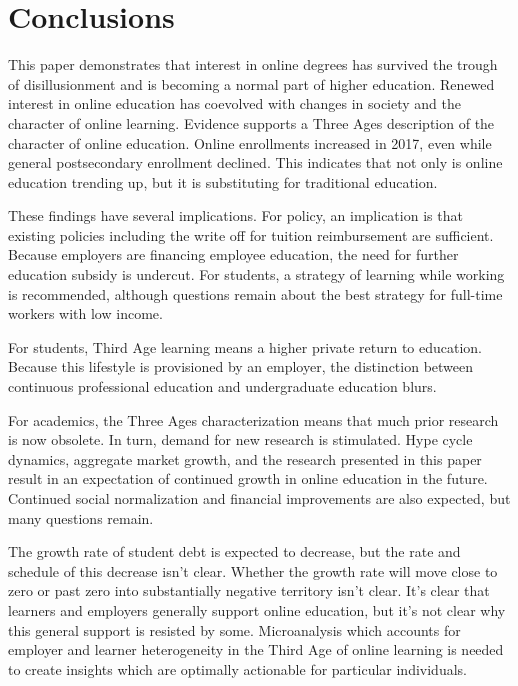 \documentclass[review]{elsarticle}
\begin{document}
    \section{Conclusions}

    This paper demonstrates that interest in online degrees has survived the trough of disillusionment
    and is becoming a normal part of higher education.
    Renewed interest in online education has coevolved with changes in society and the character of
    online learning. Evidence supports a Three Ages description of the character of online education.
    Online enrollments increased in 2017, even while general postsecondary enrollment declined\cite{lederman2018online}.
    This indicates that not only is online education trending up, but it is substituting for traditional education.

    These findings have several implications. For policy, an implication is that existing policies
    including the write off for tuition reimbursement are sufficient.
    Because employers are financing employee education, the need for further education subsidy is undercut.
    For students, a strategy of learning while working is recommended,
    although questions remain about the best strategy for full-time workers with low income.

    For students, Third Age learning means a higher private return to education.
    Because this lifestyle is provisioned by an employer,
    the distinction between continuous professional education and undergraduate education blurs.

    For academics, the Three Ages characterization means that much prior research is now obsolete.
    In turn, demand for new research is stimulated.
    Hype cycle dynamics, aggregate market growth, and the research presented in this paper
    result in an expectation of continued growth in online education in the future.
    Continued social normalization and financial improvements are also expected,
    but many questions remain.

    The growth rate of student debt is expected to decrease, but the rate and schedule of this decrease isn't clear.
    Whether the growth rate will move close to zero or past zero into substantially negative territory isn't clear.
    It's clear that learners and employers generally support online education,
    but it's not clear why this general support is resisted by some.
    Microanalysis which accounts for employer and learner heterogeneity in the Third Age
    of online learning is needed to create insights which are optimally actionable for particular individuals.

    

    
\end{document}
